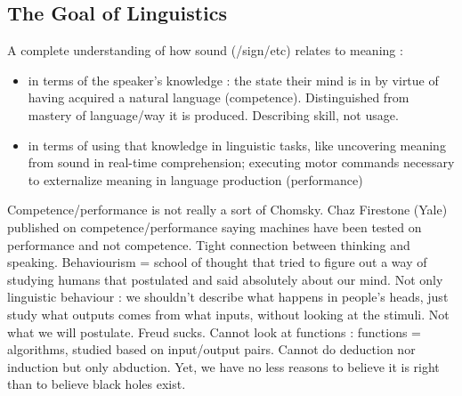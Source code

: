\documentclass{cours}
\begin{document}
\subsection{The Goal of Linguistics}
A complete understanding of how sound (/sign/etc) relates to meaning\! :
\begin{itemize}
    \item in terms of the speaker's knowledge\! : the state their mind is in by virtue of having acquired a natural language (competence). Distinguished from mastery of language/way it is produced. Describing skill, not usage.
    \item in terms of using that knowledge in linguistic tasks, like uncovering meaning from sound in real-time comprehension; executing motor commands necessary to externalize meaning in language production (performance)
\end{itemize}
Competence/performance is not really a sort of Chomsky. Chaz Firestone (Yale) published on competence/performance saying machines have been tested on performance and not competence.
Tight connection between thinking and speaking.
Behaviourism = school of thought that tried to figure out a way of studying humans that postulated and said absolutely about our mind. Not only linguistic behaviour\! : we shouldn't describe what happens in people's heads, just study what outputs comes from what inputs, without looking at the stimuli. Not what we will postulate.
Freud sucks.
Cannot look at functions\! : functions = algorithms, studied based on input/output pairs. Cannot do deduction nor induction but only abduction. Yet, we have no less reasons to believe it is right than to believe black holes exist.
\end{document}
